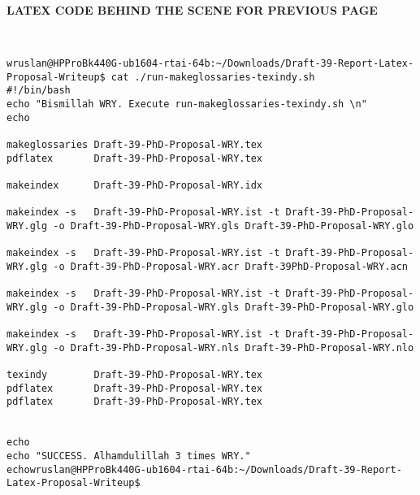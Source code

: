 \clearpage
\pagebreak

\textbf{LATEX CODE BEHIND THE SCENE FOR PREVIOUS PAGE}
\vspace*{1\baselineskip}


\begin{lstlisting}[caption={Advice on Latex codes behind the scene}, label=lst:Advice on Latex codes behind the scene]


wruslan@HPProBk440G-ub1604-rtai-64b:~/Downloads/Draft-39-Report-Latex-Proposal-Writeup$ cat ./run-makeglossaries-texindy.sh 
#!/bin/bash
echo "Bismillah WRY. Execute run-makeglossaries-texindy.sh \n"
echo

makeglossaries Draft-39-PhD-Proposal-WRY.tex
pdflatex       Draft-39-PhD-Proposal-WRY.tex

makeindex      Draft-39-PhD-Proposal-WRY.idx

makeindex -s   Draft-39-PhD-Proposal-WRY.ist -t Draft-39-PhD-Proposal-WRY.glg -o Draft-39-PhD-Proposal-WRY.gls Draft-39-PhD-Proposal-WRY.glo

makeindex -s   Draft-39-PhD-Proposal-WRY.ist -t Draft-39-PhD-Proposal-WRY.glg -o Draft-39-PhD-Proposal-WRY.acr Draft-39PhD-Proposal-WRY.acn

makeindex -s   Draft-39-PhD-Proposal-WRY.ist -t Draft-39-PhD-Proposal-WRY.glg -o Draft-39-PhD-Proposal-WRY.gls Draft-39-PhD-Proposal-WRY.glo

makeindex -s   Draft-39-PhD-Proposal-WRY.ist -t Draft-39-PhD-Proposal-WRY.glg -o Draft-39-PhD-Proposal-WRY.nls Draft-39-PhD-Proposal-WRY.nlo

texindy		   Draft-39-PhD-Proposal-WRY.tex
pdflatex       Draft-39-PhD-Proposal-WRY.tex
pdflatex       Draft-39-PhD-Proposal-WRY.tex


echo
echo "SUCCESS. Alhamdulillah 3 times WRY."
echowruslan@HPProBk440G-ub1604-rtai-64b:~/Downloads/Draft-39-Report-Latex-Proposal-Writeup$ 

\end{lstlisting}	


